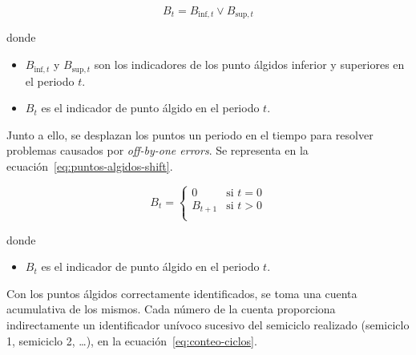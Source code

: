   \begin{samepage}

    \begin{equation}
      \label{eq:puntos-algidos}
      B_{t} = B_{\text{inf}, t} \lor B_{\text{sup}, t}
    \end{equation}

    donde

    \begin{itemize}

      \item \( B_{\text{inf}, t} \) y \( B_{\text{sup}, t} \) son los indicadores de los punto álgidos inferior y superiores en el periodo \( t \).

      \item \( B_{t} \) es el indicador de punto álgido en el periodo \( t \).

    \end{itemize}

  \end{samepage}

  Junto a ello, se desplazan los puntos un periodo en el tiempo para resolver problemas causados por \textit{off-by-one errors}. Se representa en la ecuación~\ref{eq:puntos-algidos-shift}.

  \begin{samepage}

    \begin{equation}
      \label{eq:puntos-algidos-shift}
      B_t =
      \begin{cases}
        0       & \text{si } t = 0 \\
        B_{t+1} & \text{si } t > 0 \\
      \end{cases}
    \end{equation}

    donde

    \begin{itemize}

      \item \( B_{t} \) es el indicador de punto álgido en el periodo \( t \).

    \end{itemize}

  \end{samepage}

  Con los puntos álgidos correctamente identificados, se toma una cuenta acumulativa de los mismos. Cada número de la cuenta proporciona indirectamente un identificador unívoco sucesivo del semiciclo realizado (semiciclo 1, semiciclo 2, \ldots), en la ecuación~\ref{eq:conteo-ciclos}.

